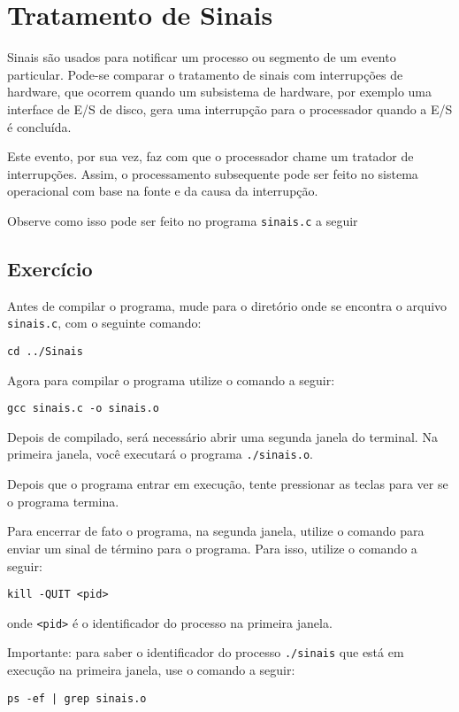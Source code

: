 \chapter{Tratamento de Sinais}

Sinais são usados para notificar um processo ou segmento de um evento particular. Pode-se comparar o tratamento de sinais com interrupções de hardware, que ocorrem quando um subsistema de hardware, por exemplo uma interface de E/S de disco, gera uma interrupção para o processador quando a E/S é concluída.

Este evento, por sua vez, faz com que o processador chame um tratador de interrupções. Assim, o processamento subsequente pode ser feito no sistema operacional com base na fonte e da causa da interrupção.

Observe como isso pode ser feito no programa \texttt{sinais.c} a seguir



\section{Exercício}
 Antes de compilar o programa, mude para o diretório onde se encontra o arquivo \texttt{sinais.c}, com o seguinte comando:

\begin{lstlisting}[style=MyBashStyle]
cd ../Sinais
\end{lstlisting}

Agora para compilar o programa utilize o comando a seguir:
\begin{lstlisting}[style=MyBashStyle]
gcc sinais.c -o sinais.o 
\end{lstlisting}

Depois de compilado, será necessário abrir uma segunda janela do terminal. Na primeira janela, você executará o programa \texttt{./sinais.o}. 

Depois que o programa entrar em execução, tente pressionar as teclas  para ver se o programa termina.

Para encerrar de fato o programa, na segunda janela, utilize o comando  para enviar um sinal de término para o programa. Para isso, utilize o comando a seguir:

\begin{lstlisting}[style=MyBashStyle]
kill -QUIT <pid>
\end{lstlisting}

\noindent onde \texttt{<pid>} é o identificador do processo na primeira janela.

Importante: para saber o identificador do processo \texttt{./sinais} que está em execução na primeira janela, use o comando a seguir:

\begin{lstlisting}[style=MyBashStyle]
ps -ef | grep sinais.o
\end{lstlisting}
